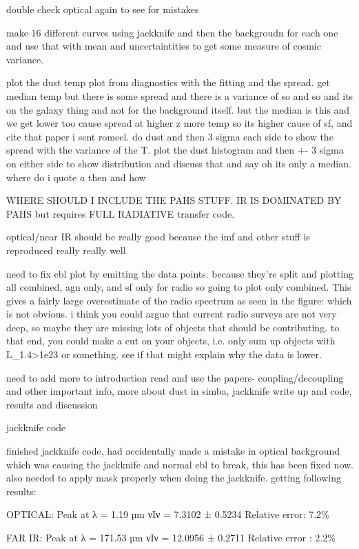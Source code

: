 \documentclass[a4paper, 11pt, oneside]{researchjournal} %
\begin{document}
double check optical again to see for mistakes

make 16 different curves using jackknife and then the backgroudn for each one and use that with mean and uncertaintities to get some measure of cosmic variance.

plot the dust temp plot from diagnostics with the fitting and the spread. get median temp but there is some spread and there is a variance of so and so and its on the galaxy thing and not for the background itself. but the median is this and we get lower too cause spread at higher z more temp so its higher cause of sf, and cite that paper i sent romeel. do dust and then 3 sigma each side to show the spread with the variance of the T. plot the dust histogram and then +- 3 sigma on either side to show distribution and discuss that and say oh its only a median. where do i quote $a$ then and how

WHERE SHOULD I INCLUDE THE PAHS STUFF. IR IS DOMINATED BY PAHS but requires FULL RADIATIVE transfer code. 

optical/near IR should be really good because the imf and other stuff is reproduced really really well

need to fix ebl plot by emitting the data points. because they're split and plotting all combined, agn only, and sf only for radio so going to plot only combined. This gives a fairly large overestimate of the radio spectrum as seen in the figure: which is not obvious. i think you could argue that current radio surveys are not very deep, so maybe they are missing lots of objects that should be contributing. to that end, you could make a cut on your objects, i.e. only sum up objects with L\_1.4>1e23 or something. see if that might explain why the data is lower.

need to add more to introduction read and use the papers- coupling/decoupling and other important info, more about dust in simba, jackknife write up and code, results and discussion

jackknife code

 finished jackknife code, had accidentally made a mistake in optical background which was causing the jackknife and normal ebl to break, this has been fixed now. also needed to apply mask properly when doing the jackknife. getting following results:

OPTICAL:
Peak at λ = 1.19 µm
νIν = 7.3102 ± 0.5234
Relative error: 7.2\%

FAR IR:
Peak at λ = 171.53 µm
νIν = 12.0956 ± 0.2711
Relative error : 2.2\%
\end{document}
